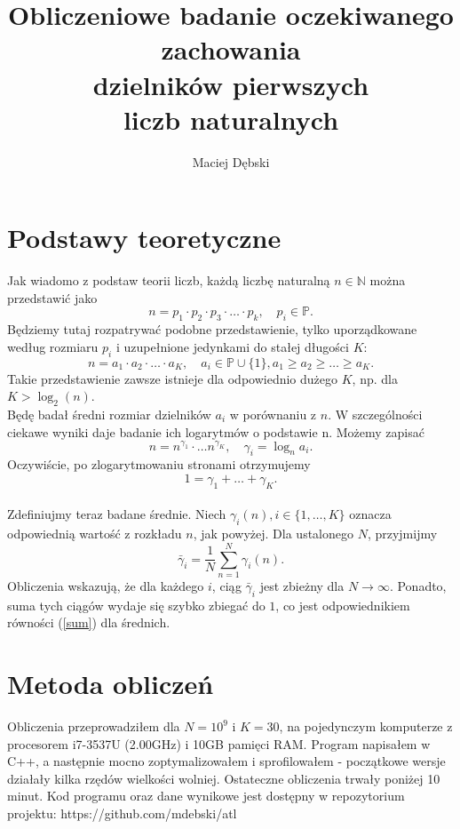 \documentclass{report}
\title{Obliczeniowe badanie oczekiwanego zachowania \\ dzielników pierwszych \\ liczb naturalnych}
\author{Maciej Dębski}
\newcommand{\N}{\mathbb{N}}
\renewcommand{\P}{\mathbb{P}}
\newcommand{\set}[1]{\{#1\}}
\begin{document}
\maketitle

\chapter*{Podstawy teoretyczne}
Jak wiadomo z podstaw teorii liczb, każdą liczbę naturalną $n \in \N$ można przedstawić jako
$$ n = p_1 \cdot p_2 \cdot p_3 \cdot \ldots \cdot p_k, \quad p_i \in \P. $$
Będziemy tutaj rozpatrywać podobne przedstawienie, tylko uporządkowane według rozmiaru $p_i$ i uzupełnione jedynkami do stałej długości $K$:
$$ n = a_1 \cdot a_2 \cdot \ldots \cdot a_K, \quad a_i \in \P \cup \set{1}, a_1 \geq a_2 \geq \ldots \geq a_K. $$
Takie przedstawienie zawsze istnieje dla odpowiednio dużego $K$, np. dla $K > \log_2(n)$. \\

Będę badał średni rozmiar dzielników $a_i$ w porównaniu z $n$. W szczególności ciekawe wyniki daje badanie ich logarytmów o podstawie n. Możemy zapisać
$$ n = n^{\gamma_1} \cdot \ldots n^{\gamma_K}, \quad \gamma_i = \log_n{a_i}. $$
Oczywiście, po zlogarytmowaniu stronami otrzymujemy
\begin{equation} \label{sum} 1 = \gamma_1 + \ldots + \gamma_K. \end{equation} \\

Zdefiniujmy teraz badane średnie. Niech $\gamma_i(n), i \in \set{1, \ldots, K}$ oznacza odpowiednią wartość z rozkładu $n$, jak powyżej. Dla ustalonego $N$, przyjmijmy
$$ \bar{\gamma}_i = \frac{1}{N} \sum_{n=1}^{N} \gamma_i(n). $$
Obliczenia wskazują, że dla każdego $i$, ciąg $\bar{\gamma}_i$ jest zbieżny dla $N \to \infty$. Ponadto, suma tych ciągów wydaje się szybko zbiegać do $1$,
co jest odpowiednikiem równości (\ref{sum}) dla średnich.

\chapter*{Metoda obliczeń}

Obliczenia przeprowadziłem dla $N = 10^9$ i $K = 30$, na pojedynczym komputerze z procesorem i7-3537U (2.00GHz) i 10GB pamięci RAM.
Program napisałem w C++, a następnie mocno zoptymalizowałem i sprofilowałem - początkowe wersje działały kilka rzędów wielkości wolniej.
Ostateczne obliczenia trwały poniżej 10 minut. Kod programu oraz dane wynikowe jest dostępny w repozytorium projektu: https://github.com/mdebski/atl
\end{document}
